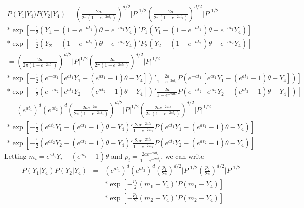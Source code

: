 \documentclass[12pt]{article}
\begin{document}
\begin{eqnarray}
P(Y_1 | Y_4) P(Y_2 | Y_4 )  =  \left( \frac{2a}{ 2 \pi (1-e^{-2at_1})} \right)^{d/2}  |P|^{1/2}   \left( \frac{2a}{ 2 \pi (1-e^{-2at_2})} \right)^{d/2} |P|^{1/2} \\
 * \exp \left[ -\frac{1}{2} \left( Y_1 - (1- e^{-at_1}) \theta - e^{-at_1} Y_4 \right)' P_1 \left( Y_1 - (1 - e^{-at_1}) \theta - e^{-at_1} Y_4   \right)   \right] \\
 * \exp \left[ -\frac{1}{2} \left( Y_2 - (1 - e^{-at_2}) \theta - e^{-at_2} Y_4  \right)' P_2 \left( Y_2 - (1 - e^{-at_2}) \theta - e^{-at_2} Y_4   \right)   \right] \\
 =  \left( \frac{2a}{ 2 \pi (1-e^{-2at_1})} \right)^{d/2}  |P|^{1/2}   \left( \frac{2a}{ 2 \pi (1-e^{-2at_2})} \right)^{d/2} |P|^{1/2} \\
 * \exp \left[ -\frac{1}{2} \left( e^{-at_1}  [e^{at_1} Y_1 - (e^{at_1} - 1) \theta - Y_4] \right)' \frac{2a}{1-e^{-2at_1}} P \left(  e^{-at_1}  [e^{at_1} Y_1 - (e^{at_1} - 1) \theta - Y_4]   \right)   \right] \\
 * \exp \left[ -\frac{1}{2} \left( e^{-at_2}  [e^{at_2} Y_2 - (e^{at_2} - 1) \theta - Y_4]  \right)' \frac{2a}{1-e^{-2at_2}} P \left( e^{-at_2}  [e^{at_2} Y_2 - (e^{at_2} - 1) \theta - Y_4]   \right)   \right] \\
 =  (e^{at_1})^d (e^{at_2})^d  \left( \frac{2a e^{-2at_1}}{ 2 \pi (1-e^{-2at_1})} \right)^{d/2}  |P|^{1/2}   \left( \frac{2a e^{-2at_2}}{ 2 \pi (1-e^{-2at_2})} \right)^{d/2} |P|^{1/2} \\
 * \exp \left[ -\frac{1}{2} \left(e^{at_1} Y_1 - (e^{at_1} - 1) \theta - Y_4 \right)' \frac{2a e^{-2at_1}}{1-e^{-2at_1}} P \left(  e^{at_1} Y_1 - (e^{at_1} - 1) \theta - Y_4   \right)   \right] \\
 * \exp \left[ -\frac{1}{2} \left( e^{at_2} Y_2 - (e^{at_2} - 1) \theta - Y_4  \right)' \frac{2a e^{-2at_2}}{1-e^{-2at_2}} P \left( e^{at_2} Y_2 - (e^{at_2} - 1) \theta - Y_4   \right)   \right] 
\end{eqnarray}
Letting $m_i = e^{at_i} Y_i - (e^{at_i} - 1) \theta $ and $p_i = \frac{2ae^{-2at_i}}{1-e^{-2at_i}} $, we can write
\begin{eqnarray}
P(Y_1 | Y_4) P(Y_2 | Y_4 ) & = &  (e^{at_1})^d (e^{at_2})^d  \left( \frac{p_1}{ 2 \pi} \right)^{d/2}  |P|^{1/2}   \left( \frac{p_2}{ 2 \pi} \right)^{d/2} |P|^{1/2}  \\
& & * \exp \left[ -\frac{p_1}{2} \left( m_1  - Y_4  \right)' P \left( m_1 - Y_4  \right)  \right] \\
 & & * \exp \left[ -\frac{p_2}{2} \left(m_2 - Y_4 \right)' P \left( m_2 - Y_4  \right)   \right] 
\end{eqnarray}
\end{document}
